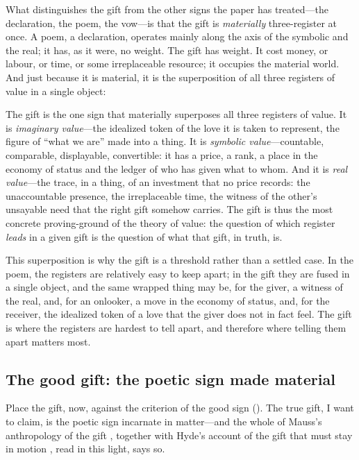 What distinguishes the gift from the other signs the paper has treated---the declaration, the poem, the vow---is that the gift is \emph{materially} three-register at once. A poem, a declaration, operates mainly along the axis of the symbolic and the real; it has, as it were, no weight. The gift has weight. It cost money, or labour, or time, or some irreplaceable resource; it occupies the material world. And just because it is material, it is the superposition of all three registers of value in a single object:

\begin{claim}
The gift is the one sign that materially superposes all three registers of value. It is \emph{imaginary value}---the idealized token of the love it is taken to represent, the figure of ``what we are'' made into a thing. It is \emph{symbolic value}---countable, comparable, displayable, convertible: it has a price, a rank, a place in the economy of status and the ledger of who has given what to whom. And it is \emph{real value}---the trace, in a thing, of an investment that no price records: the unaccountable presence, the irreplaceable time, the witness of the other's unsayable need that the right gift somehow carries. The gift is thus the most concrete proving-ground of the theory of value: the question of which register \emph{leads} in a given gift is the question of what that gift, in truth, is.
\end{claim}

This superposition is why the gift is a threshold rather than a settled case. In the poem, the registers are relatively easy to keep apart; in the gift they are fused in a single object, and the same wrapped thing may be, for the giver, a witness of the real, and, for an onlooker, a move in the economy of status, and, for the receiver, the idealized token of a love that the giver does not in fact feel. The gift is where the registers are hardest to tell apart, and therefore where telling them apart matters most.

\subsection{The good gift: the poetic sign made material}
\label{p09:sec:good-gift}

Place the gift, now, against the criterion of the good sign (). The true gift, I want to claim, is the poetic sign incarnate in matter---and the whole of Mauss's anthropology of the gift \parencite{mauss1990}, together with Hyde's account of the gift that must stay in motion \parencite{hyde1983}, read in this light, says so.

